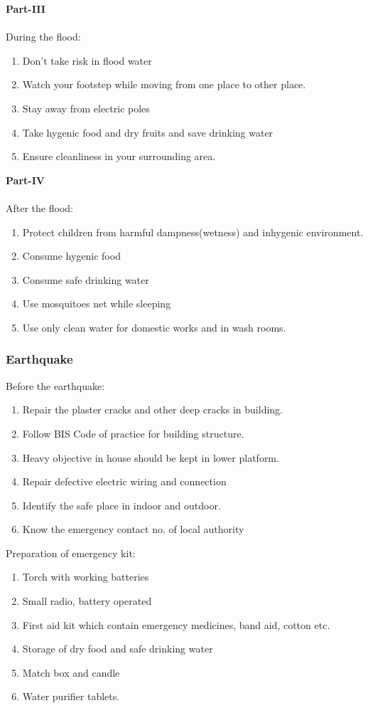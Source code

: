 \documentclass[12pt,a4paper]{article}
\begin{document}
\textbf{Part-III}\\ \\
During the flood: 
\begin{enumerate}
	\item Don't take risk in flood water
	\item Watch your footstep while moving from one place to other place.
	\item Stay away from electric poles
	\item Take hygenic food and dry fruits and save drinking water
	\item Ensure cleanliness in your surrounding area.
\end{enumerate}

\textbf{Part-IV}\\ \\
After the flood: 
\begin{enumerate}
	\item Protect children from harmful dampness(wetness) and inhygenic environment.
	\item Consume hygenic food
	\item Consume safe drinking water
	\item Use mosquitoes net while sleeping
	\item Use only clean water for domestic works and in wash rooms.
\end{enumerate}

\subsubsection*{Earthquake}
Before the earthquake:
\begin{enumerate}
	\item Repair the plaster cracks and other deep cracks in building.
	\item Follow BIS Code of practice for building structure.
	\item Heavy objective in house should be kept in lower platform.
	\item Repair defective electric wiring and connection
	\item Identify the safe place in indoor and outdoor.
	\item Know the emergency contact no. of local authority
\end{enumerate}

Preparation of emergency kit:
\begin{enumerate}
	\item Torch with working batteries
	\item Small radio, battery operated
	\item First aid kit which contain emergency medicines, band aid, cotton etc.
	\item Storage of dry food and safe drinking water
	\item Match box and candle
	\item Water purifier tablets.
\end{enumerate}
\end{document}
